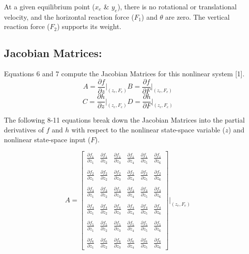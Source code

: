 \documentclass[conference]{IEEEtran}
\begin{document}
At a given equilibrium point ($x_e$ \& $y_e$), there is no rotational or translational velocity, and the horizontal reaction force ($F_1$) and $\theta$ are zero. The vertical reaction force ($F_2$) supports its weight. 

\subsection{Jacobian Matrices:}
Equations 6 and 7 compute the Jacobian Matrices for this nonlinear system [1].
\[ 
A = \frac{\partial f}{\partial z}\bigg|_{(z_e,F_e)}
B = \frac{\partial f}{\partial F}\bigg|_{(z_e,F_e)}
\tag{6}
\]
\[ 
C = \frac{\partial h}{\partial z}\bigg|_{(z_e,F_e)}
D = \frac{\partial h}{\partial F}\bigg|_{(z_e,F_e)}
\tag{7}
\]

\newpage
The following 8-11 equations break down the Jacobian Matrices into the partial derivatives of $f$ and $h$ with respect to the nonlinear state-space variable ($z$) and nonlinear state-space input ($F$).

\[
A = 
\begin{bmatrix}
\frac{\partial f_1}{\partial z_1}&\frac{\partial f_1}{\partial z_2}& \frac{\partial f_1}{\partial z_3}& \frac{\partial f_1}{\partial z_4}& \frac{\partial f_1}{\partial z_5} &\frac{\partial f_1}{\partial z_6}\\\\
\frac{\partial f_2}{\partial z_1}&\frac{\partial f_2}{\partial z_2}& \frac{\partial f_2}{\partial z_3}& \frac{\partial f_2}{\partial z_4}& \frac{\partial f_2}{\partial z_5} &\frac{\partial f_2}{\partial z_6}\\\\
\frac{\partial f_3}{\partial z_1}&\frac{\partial f_3}{\partial z_2}& \frac{\partial f_3}{\partial z_3}& \frac{\partial f_3}{\partial z_4}& \frac{\partial f_3}{\partial z_5} &\frac{\partial f_3}{\partial z_6}\\\\
\frac{\partial f_4}{\partial z_1}&\frac{\partial f_4}{\partial z_2}& \frac{\partial f_4}{\partial z_3}& \frac{\partial f_4}{\partial z_4}& \frac{\partial f_4}{\partial z_5} &\frac{\partial f_4}{\partial z_6}\\\\
\frac{\partial f_5}{\partial z_1}&\frac{\partial f_5}{\partial z_2}& \frac{\partial f_5}{\partial z_3}& \frac{\partial f_5}{\partial z_4}& \frac{\partial f_5}{\partial z_5} &\frac{\partial f_5}{\partial z_6}\\\\
\frac{\partial f_6}{\partial z_1}&\frac{\partial f_6}{\partial z_2}& \frac{\partial f_6}{\partial z_3}& \frac{\partial f_6}{\partial z_4}& \frac{\partial f_6}{\partial z_5} &\frac{\partial f_6}{\partial z_6}
\end{bmatrix}
\Bigg|_{(z_e,F_e)} 
\tag{8}
\] 
\end{document}
